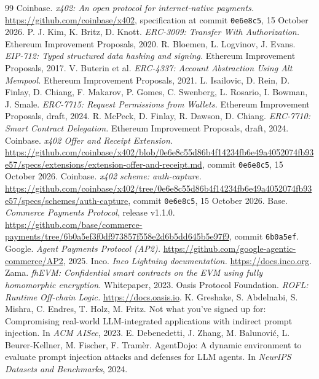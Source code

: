\documentclass[10pt,a4paper,twocolumn]{article}
\newcommand{\code}[1]{\texttt{#1}}
\begin{document}
{\raggedright
\begin{thebibliography}{99}\footnotesize\setlength{\itemsep}{0pt}
 Coinbase. \emph{x402: An open protocol for internet-native payments.} \url{https://github.com/coinbase/x402}, specification at commit \code{0e6e8c5}, 15 October 2026.
 P. J. Kim, K. Britz, D. Knott. \emph{ERC-3009: Transfer With Authorization.} Ethereum Improvement Proposals, 2020.
 R. Bloemen, L. Logvinov, J. Evans. \emph{EIP-712: Typed structured data hashing and signing.} Ethereum Improvement Proposals, 2017.
 V. Buterin et al. \emph{ERC-4337: Account Abstraction Using Alt Mempool.} Ethereum Improvement Proposals, 2021.
 L. Isailovic, D. Rein, D. Finlay, D. Chiang, F. Makarov, P. Gomes, C. Swenberg, L. Rosario, I. Bowman, J. Smale. \emph{ERC-7715: Request Permissions from Wallets.} Ethereum Improvement Proposals, draft, 2024.
 R. McPeck, D. Finlay, R. Dawson, D. Chiang. \emph{ERC-7710: Smart Contract Delegation.} Ethereum Improvement Proposals, draft, 2024.
 Coinbase. \emph{x402 Offer and Receipt Extension.} \url{https://github.com/coinbase/x402/blob/0e6e8c55d86b4f14234fb6e49a4052074fb93e57/specs/extensions/extension-offer-and-receipt.md}, commit \code{0e6e8c5}, 15 October 2026.
 Coinbase. \emph{x402 scheme: auth-capture.} \url{https://github.com/coinbase/x402/tree/0e6e8c55d86b4f14234fb6e49a4052074fb93e57/specs/schemes/auth-capture}, commit \code{0e6e8c5}, 15 October 2026.
 Base. \emph{Commerce Payments Protocol}, release v1.1.0. \url{https://github.com/base/commerce-payments/tree/6b0a5ef3f0df973857f558e2d6b5dd645b5e97f9}, commit \code{6b0a5ef}.
 Google. \emph{Agent Payments Protocol (AP2).} \url{https://github.com/google-agentic-commerce/AP2}, 2025.
 Inco. \emph{Inco Lightning documentation.} \url{https://docs.inco.org}.
 Zama. \emph{fhEVM: Confidential smart contracts on the EVM using fully homomorphic encryption.} Whitepaper, 2023.
 Oasis Protocol Foundation. \emph{ROFL: Runtime Off-chain Logic.} \url{https://docs.oasis.io}.
 K. Greshake, S. Abdelnabi, S. Mishra, C. Endres, T. Holz, M. Fritz. Not what you've signed up for: Compromising real-world LLM-integrated applications with indirect prompt injection. In \emph{ACM AISec}, 2023.
 E. Debenedetti, J. Zhang, M. Balunovi\'c, L. Beurer-Kellner, M. Fischer, F. Tram\`er. AgentDojo: A dynamic environment to evaluate prompt injection attacks and defenses for LLM agents. In \emph{NeurIPS Datasets and Benchmarks}, 2024.

\end{thebibliography}}
\end{document}
